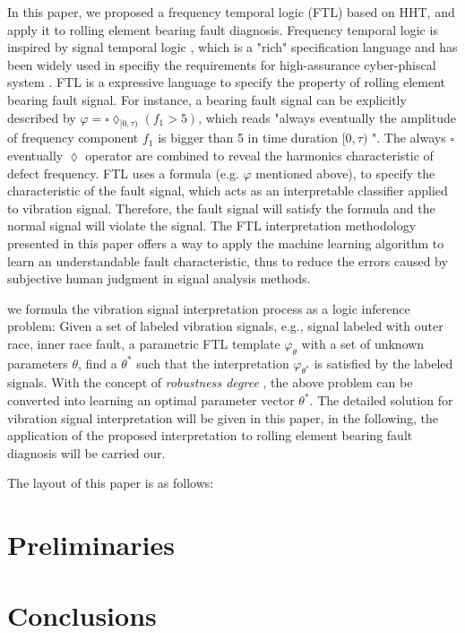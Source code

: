 \documentclass[journal]{IEEEtran}
\theoremstyle{definition}
\begin{document}
In this paper, we proposed a frequency temporal  logic (FTL) based on HHT, and apply it to rolling element bearing fault diagnosis. Frequency temporal logic is inspired by signal temporal logic \cite{maler2004monitoring,donze2010robust}, which is a "rich" specification language and has been widely used in specifiy the requirements for high-assurance cyber-phiscal system \cite{chen2016active}. FTL is a expressive language to specify the property of rolling element bearing fault signal. For instance,  a bearing fault signal can be explicitly described by $\varphi=\square\lozenge_{[0,\tau)} (f_{1}>5)$, which reads "always eventually the amplitude of frequency component $f_{1}$ is bigger than 5 in time duration $[0,\tau)$ ". The always  $\square$ eventually $\lozenge$  operator are combined to reveal the  harmonics characteristic of defect frequency. FTL uses a formula (e.g. $\varphi$ mentioned above), to specify the characteristic of the fault signal, which acts as an interpretable classifier applied to vibration signal. Therefore, the fault signal will satisfy the formula and the normal signal will violate the signal. The FTL interpretation methodology presented in this paper offers a way to apply the machine learning algorithm to learn an understandable fault characteristic, thus to reduce the errors caused by subjective human judgment in signal analysis methods.

we formula the vibration signal interpretation process as a logic inference problem: Given a set of labeled vibration signals, e.g., signal labeled with outer race, inner race fault, a parametric FTL template $\varphi_{\theta}$ with a set of unknown parameters $\theta$, find a $\theta^{*}$ such that the interpretation $\varphi_{\theta^{*}}$ is satisfied by the labeled signals. With the concept of \emph{robustness degree} \cite{donze2010robust}, the above problem can be converted into learning an optimal parameter vector $\theta^{*}$. The detailed solution for vibration signal interpretation will be given in this paper, in the following, the application of the proposed interpretation to rolling element bearing fault diagnosis will be carried our.

The layout of this paper is as follows: 
 

\section{Preliminaries}

\section{Conclusions}






 
\end{document}
